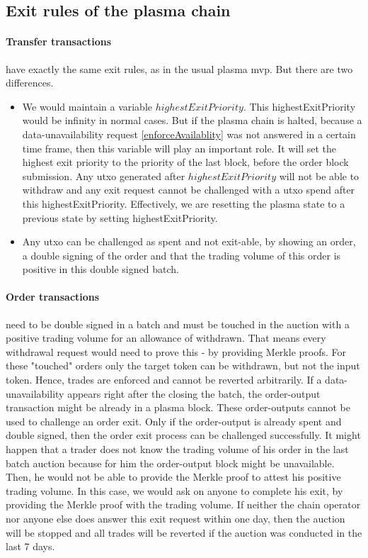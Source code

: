 \documentclass[11pt,parskip=full]{scrartcl}%
\begin{document}
\subsection{Exit rules of the plasma chain}
\label{exitRules}
\paragraph{Transfer transactions} have exactly the same exit rules, as in the usual plasma mvp. But there are two differences. 
\begin{itemize}
  \item We would maintain a variable $highestExitPriority$. This highestExitPriority would be infinity in normal cases. But if the plasma chain is halted, because a data-unavailability request \ref{enforceAvailablity} was not answered in a certain time frame, then this variable will play an important role. It will set the highest exit priority to the priority of the last block, before the order block submission. Any utxo generated after $highestExitPriority$ will not be able to withdraw and any exit request cannot be challenged with a utxo spend after this highestExitPriority. Effectively, we are resetting the plasma state to a previous state by setting highestExitPriority.
\item Any utxo can be challenged as spent and not exit-able, by showing an order, a double signing of the order and that the trading volume of this order is positive in this double signed batch.
\end{itemize}
\paragraph{Order transactions} need to be double signed in a batch and must be touched in the auction with a positive trading volume for an allowance of withdrawn. That means every withdrawal request would need to prove this - by providing Merkle proofs. For these  "touched" orders only the target token can be withdrawn, but not the input token. Hence, trades are enforced and cannot be reverted arbitrarily.
If a data-unavailability appears right after the closing the batch, the order-output transaction might be already in a plasma block. These order-outputs cannot be used to challenge an order exit. Only if the order-output is already spent and double signed, then the order exit process can be challenged successfully.
It might happen that a trader does not know the trading volume of his order in the last batch auction because for him the order-output block might be unavailable. Then, he would not be able to provide the Merkle proof to attest his positive trading volume. In this case, we would ask on anyone to complete his exit, by providing the Merkle proof with the trading volume. If neither the chain operator nor anyone else does answer this exit request within one day, then the auction will be stopped and all trades will be reverted if the auction was conducted in the last 7 days.
\end{document}
